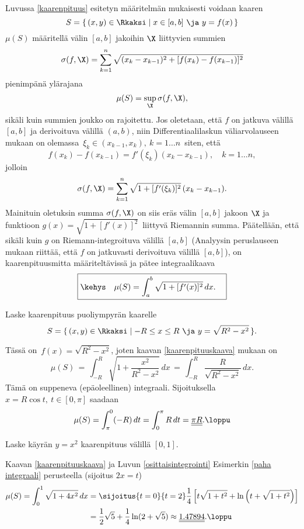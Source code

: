 Luvussa \ref{kaarenpituus} esitetyn määritelmän mukaisesti voidaan kaaren
\[
S = \{\,(x,y) \in \Rkaksi \mid x\in[a,b]\ \ja\ y=f(x)\,\}
\]
%
 $\mu(S)$ määritellä välin $[a,b]$ jakoihin $\X$ liittyvien summien
\[
\sigma(f,\X) = \sum_{k=1}^n \sqrt{(x_k-x_{k-1})^2+[f(x_k)-f(x_{k-1})]^2}
\]
pienimpänä ylärajana
\[
\mu(S) = \sup_\X \sigma(f,\X),
\]
sikäli kuin summien joukko on rajoitettu. Jos oletetaan, että $f$ on jatkuva välillä $[a,b]$ ja
derivoituva välillä $(a,b)$, niin Differentiaalilaskun väliarvolauseen mukaan on olemassa 
$\,\xi_k\in(x_{k-1},x_k),\ k=1 \ldots n\,$ siten, että
\[
f(x_k)-f(x_{k-1}) = f'(\xi_k)(x_k-x_{k-1}), \quad k=1 \ldots n,
\]
jolloin
\[
\sigma(f,\X) = \sum_{k=1}^n \sqrt{1+[f'(\xi_k)]^2}\,(x_k-x_{k-1}).
\]
Mainituin oletuksin summa $\sigma(f,\X)$ on siis eräs välin $[a,b]$ jakoon $\X$  ja funktioon
$g(x)=\sqrt{1+[f'(x)]^2}\,$ liittyvä Riemannin summa. Päätellään, että sikäli kuin $g$ on
Riemann-integroituva välillä $[a,b]$ (Analyysin peruslauseen mukaan riittää, että $f$ on 
jatkuvasti derivoituva välillä $[a,b]$), on kaarenpituusmitta määriteltävissä ja pätee 
integraalikaava
\begin{equation} \label{kaarenpituuskaava}
\boxed{\kehys\quad \mu(S) = \int_a^b \sqrt{1+[f'(x)]^2}\,dx. \quad}
\end{equation}
\begin{Exa} \label{ympyrän kaari: pituus} Laske kaarenpituus puoliympyrän kaarelle
\[
S = \{\,(x,y) \in \Rkaksi \mid -R \le x \le R\ \ja\ y=\sqrt{R^2-x^2}\,\}.
\]
\end{Exa}
\ratk Tässä on $\,f(x)=\sqrt{R^2-x^2}$, joten kaavan \eqref{kaarenpituuskaava} mukaan on
\[
\mu(S) \,=\, \int_{-R}^R \sqrt{1+\frac{x^2}{R^2-x^2}}\,dx 
       \,=\, \int_{-R}^R \frac{R}{\sqrt{R^2-x^2}}\,dx.
\]
Tämä on suppeneva (epäoleellinen) integraali. Sijoituksella $x=R\cos t,\ t\in[0,\pi]$ saadaan
\[
\mu(S) = \int_\pi^0 (-R)\,dt = \int_0^\pi R\,dt = \underline{\underline{\pi R}}. \loppu
\]
\begin{Exa} Laske käyrän $y=x^2$ kaarenpituus välillä $[0,1]$. \end{Exa}
\ratk Kaavan \eqref{kaarenpituuskaava} ja Luvun \ref{osittaisintegrointi} Esimerkin
\ref{paha integraali} perusteella (sijoitus $2x=t$)
\begin{align*}
\mu(S) = \int_0^1 \sqrt{1+4x^2}\,dx 
      &= \sijoitus{t=0}{t=2}
        \frac{1}{4}\left[t\sqrt{1+t^2}+\ln\left(t+\sqrt{1+t^2}\right)\right] \\
      &= \frac{1}{2}\sqrt{5}+\frac{1}{4}\ln(2+\sqrt{5}) \approx \underline{\underline{1.47894}}. 
                                                                                       \loppu
\end{align*}
